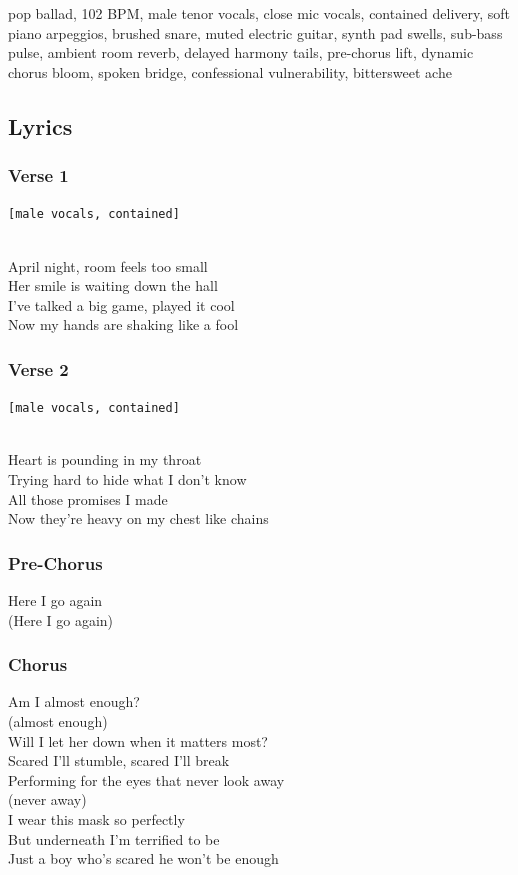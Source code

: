 pop ballad, 102 BPM, male tenor vocals, close mic vocals, contained
delivery, soft piano arpeggios, brushed snare, muted electric guitar,
synth pad swells, sub-bass pulse, ambient room reverb, delayed harmony
tails, pre-chorus lift, dynamic chorus bloom, spoken bridge,
confessional vulnerability, bittersweet ache

\subsection{Lyrics}\label{lyrics-33}

\subsubsection{Verse 1}\label{verse-1-25}

\texttt{{[}male\ vocals,\ contained{]}}\strut \\
April night, room feels too small\\
Her smile is waiting down the hall\\
I've talked a big game, played it cool\\
Now my hands are shaking like a fool

\subsubsection{Verse 2}\label{verse-2-24}

\texttt{{[}male\ vocals,\ contained{]}}\strut \\
Heart is pounding in my throat\\
Trying hard to hide what I don't know\\
All those promises I made\\
Now they're heavy on my chest like chains

\subsubsection{Pre-Chorus}\label{pre-chorus-57}

Here I go again\\
(Here I go again)

\subsubsection{Chorus}\label{chorus-74}

Am I almost enough?\\
(almost enough)\\
Will I let her down when it matters most?\\
Scared I'll stumble, scared I'll break\\
Performing for the eyes that never look away\\
(never away)\\
I wear this mask so perfectly\\
But underneath I'm terrified to be\\
Just a boy who's scared he won't be enough

